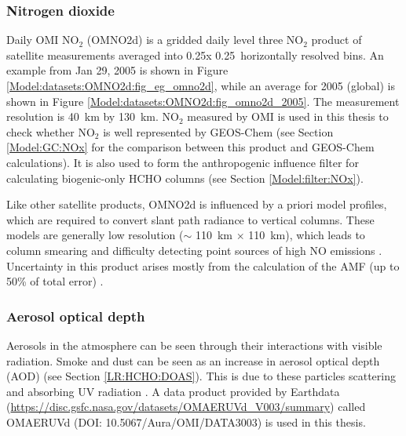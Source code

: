     \subsubsection{Nitrogen dioxide}
      \label{Model:datasets:OMNO2d}
      Daily OMI NO$_2$ (OMNO2d) is a gridded daily level three NO$_2$ product of satellite measurements averaged into 0.25\degr x 0.25\degr ~horizontally resolved bins.
      An example from Jan 29, 2005 is shown in Figure \ref{Model:datasets:OMNO2d:fig_eg_omno2d}, while an average for 2005 (global) is shown in Figure \ref{Model:datasets:OMNO2d:fig_omno2d_2005}.
      The measurement resolution is 40~km by 130~km.
      NO$_2$ measured by OMI is used in this thesis to check whether NO$_2$ is well represented by GEOS-Chem (see Section \ref{Model:GC:NOx} for the comparison between this product and GEOS-Chem calculations).
      It is also used to form the anthropogenic influence filter for calculating biogenic-only HCHO columns (see Section \ref{Model:filter:NOx}).
      
      
      
      
      Like other satellite products, OMNO2d is influenced by a priori model profiles, which are required to convert slant path radiance to vertical columns.
      These models are generally low resolution ($\sim$ 110~km $\times$ 110~km), which leads to column smearing and difficulty detecting point sources of high NO emissions \parencite{Goldberg2018}.
      Uncertainty in this product arises mostly from the calculation of the AMF (up to 50\% of total error) \parencite{Lorente2017}.
    
    \subsubsection{Aerosol optical depth}
      \label{Model:datasets:OMAERUVd}
      
      Aerosols in the atmosphere can be seen through their interactions with visible radiation. 
      Smoke and dust can be seen as an increase in aerosol optical depth (AOD) (see Section \ref{LR:HCHO:DOAS}).
      This is due to these particles scattering and absorbing UV radiation \parencite{Ahn2008}.
      A data product provided by Earthdata (\url{https://disc.gsfc.nasa.gov/datasets/OMAERUVd_V003/summary}) called OMAERUVd (DOI: 10.5067/Aura/OMI/DATA3003) is used in this thesis. 
      
